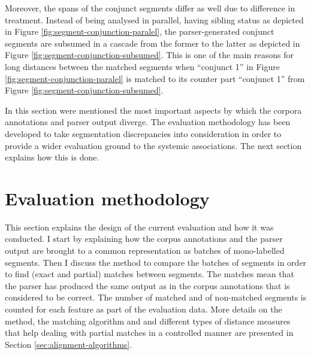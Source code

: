     Moreover, the spans of the conjunct segments differ as well due to difference in treatment. Instead of being analysed in parallel, having sibling status as depicted in Figure \ref{fig:segment-conjunction-paralel}, the parser-generated conjunct segments are subsumed in a cascade from the former to the latter as depicted in Figure \ref{fig:segment-conjunction-subsumed}. This is one of the main reasons for long distances between the matched segments when ``conjunct 1'' in Figure \ref{fig:segment-conjunction-paralel} is matched to its counter part ``conjunct 1'' from Figure \ref{fig:segment-conjunction-subsumed}. 
    
    In this section were mentioned the most important aspects by which the corpora annotations and parser output diverge. The evaluation methodology has been developed to take segmentation discrepancies into consideration in order to provide a wider evaluation ground to the systemic associations. The next section explains how this is done.
    
\section{Evaluation methodology}
\label{sec:evaluation-methodology}
    
    This section explains the design of the current evaluation and how it was conducted. I start by explaining how the corpus annotations and the parser output are brought to a common representation as batches of mono-labelled segments. Then I discuss the method to compare the batches of segments in order to find (exact and partial) matches between segments. The matches mean that the parser has produced the same output as in the corpus annotations that is considered to be correct. The number of matched and of non-matched segments is counted for each feature as part of the evaluation data. More details on the method, the matching algorithm and and different types of distance measures that help dealing with partial matches in a controlled manner are presented in Section \ref{sec:alignment-algorithms}.
    


